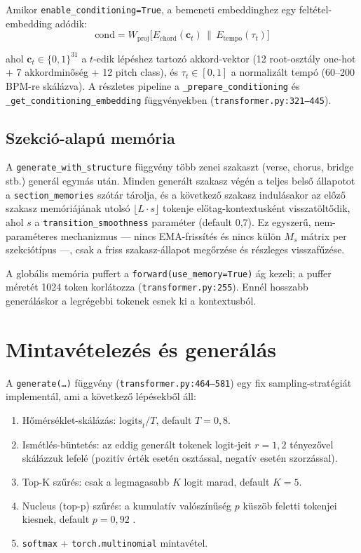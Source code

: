 Amikor \texttt{enable\_conditioning=True}, a bemeneti embeddinghez egy feltétel-embedding adódik:
\[
\mathrm{cond} = W_{\mathrm{proj}}\bigl[E_{\mathrm{chord}}(\mathbf{c}_t) \,\|\, E_{\mathrm{tempo}}(\tau_t)\bigr]
\]

ahol $\mathbf{c}_t \in \{0,1\}^{31}$ a $t$-edik lépéshez tartozó akkord-vektor (12 root-osztály one-hot + 7 akkordminőség + 12 pitch class), és $\tau_t \in [0,1]$ a normalizált tempó (60--200 BPM-re skálázva). A részletes pipe\-line a \texttt{\_prepare\_conditioning} és \texttt{\_get\_conditioning\_embedding} függvényekben (\texttt{transformer.py:321--445}).

\subsection{Szekció-alapú memória}

A \texttt{generate\_with\_structure} függvény több zenei szakaszt (verse, chorus, bridge stb.) generál egymás után. Minden generált szakasz végén a teljes belső állapotot a \texttt{section\_memories} szótár tárolja, és a következő szakasz indulásakor az előző szakasz memóriájának utolsó $\lfloor L \cdot s \rfloor$ tokenje előtag-kontextusként visszatöltődik, ahol $s$ a \texttt{transition\_smoothness} paraméter (default 0,7). Ez egyszerű, nem-paraméteres mechanizmus --- nincs EMA-frissítés és nincs külön $M_s$ mátrix per szekciótípus ---, csak a friss szakasz-állapot megőrzése és részleges visszafűzése.

A globális memória puffert a \texttt{forward(use\_memory=True)} ág kezeli; a puffer méretét 1024 token korlátozza (\texttt{transformer.py:255}). Ennél hosszabb generáláskor a legrégebbi tokenek esnek ki a kontextusból.

\section{Mintavételezés és generálás}

A \texttt{generate(\ldots)} függvény (\texttt{transformer.py:464--581}) egy fix sampling-stratégiát implementál, ami a következő lépésekből áll:

\begin{enumerate}
    \item Hőmérséklet-skálázás: $\mathrm{logits}_t / T$, default $T = 0{,}8$.
    \item Ismétlés-büntetés: az eddig generált tokenek logit-jeit $r = 1{,}2$ tényezővel skálázzuk lefelé (pozitív érték esetén osztással, negatív esetén szorzással).
    \item Top-K szűrés: csak a legmagasabb $K$ logit marad, default $K = 5$.
    \item Nucleus (top-p) szűrés: a kumulatív valószínűség $p$ küszöb feletti tokenjei kiesnek, default $p = 0{,}92$ \cite{holtzman2020nucleus}.
    \item \texttt{softmax} + \texttt{torch.multinomial} mintavétel.
\end{enumerate}

